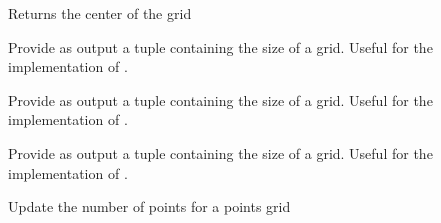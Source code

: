 \documentclass[letterpaper,10pt,english]{sphinxmanual}
\begin{document}
\begin{fulllineitems}
\begin{fulllineitems}
\end{fulllineitems}


\begin{fulllineitems}
\label{\detokenize{appendices:s2Dcd.grid.Grid.get_center}}
Returns the center of the grid

\end{fulllineitems}


\begin{fulllineitems}
\label{\detokenize{appendices:s2Dcd.grid.Grid.get_lx}}
Provide as output a tuple containing the size of a
grid. Useful for the implementation of .

\end{fulllineitems}


\begin{fulllineitems}
\label{\detokenize{appendices:s2Dcd.grid.Grid.get_ly}}
Provide as output a tuple containing the size of a
grid. Useful for the implementation of .

\end{fulllineitems}


\begin{fulllineitems}
\label{\detokenize{appendices:s2Dcd.grid.Grid.get_lz}}
Provide as output a tuple containing the size of a
grid. Useful for the implementation of .

\end{fulllineitems}


\begin{fulllineitems}
\label{\detokenize{appendices:s2Dcd.grid.Grid.get_points}}
Update the number of points for a points grid


\end{fulllineitems}
\end{fulllineitems}
\end{document}
